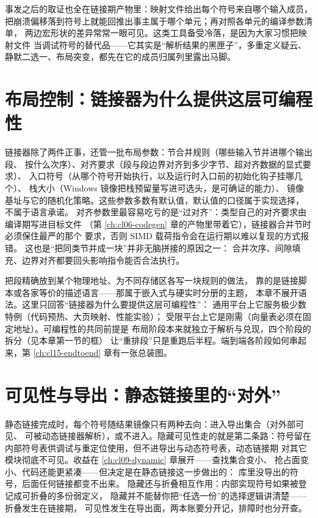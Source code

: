 \documentclass[12pt,a4paper,fontset=fandol]{ctexbook}
\newcommand{\Win}{\textsf{Windows}}
\begin{document}
事发之后的取证也全在链接期产物里：映射文件给出每个符号来自哪个输入成员，
把崩溃偏移落到符号上就能回推出事主属于哪个单元；再对照各单元的编译参数清单，
两边宏形状的差异常常一眼可见。这类工具备受冷落，是因为大家习惯把映射文件
当调试符号的替代品——它其实是“解析结果的黑匣子”，多重定义疑云、
静默二选一、布局突变，都先在它的成员归属列里露出马脚。

\section{布局控制：链接器为什么提供这层可编程性}\label{sec:cl08-layout}

链接器除了两件正事，还管一批布局参数：节合并规则（哪些输入节并进哪个输出段、
按什么次序）、对齐要求（段与段边界对齐到多少字节、超对齐数据的显式要求）、
入口符号（从哪个符号开始执行，以及运行时入口前的初始化钩子挂哪几个）、
栈大小（\Win{} 镜像把栈预留量写进可选头，是可确证的能力）、
镜像基址与它的随机化策略。这些参数多数有默认值，默认值的口径属于实现选择，
不属于语言承诺。
对齐参数里最容易吃亏的是“过对齐”：类型自己的对齐要求由编译期写进目标文件
（第 \ref{ch:cl06-codegen} 章的产物里带着它），链接器合并节时必须保住最严的那个
要求，否则 SIMD 载荷指令会在运行期以难以复现的方式报错。
这也是“把同类节并成一块”并非无脑拼接的原因之一：
合并次序、间隙填充、边界对齐都要回头影响指令能否合法执行。

把段精确放到某个物理地址、为不同存储区各写一块规则的做法，
靠的是链接脚本或各家等价的描述语言——那属于嵌入式与硬实时分册的主题，
本章不展开语法。这里只回答“链接器为什么要提供这层可编程性”：
通用平台上它服务极少数特例（代码预热、大页映射、性能实验）；
受限平台上它是刚需（向量表必须在固定地址）。可编程性的共同前提是
布局阶段本来就独立于解析与兑现，四个阶段的拆分（见本章第一节的框）
让“重排段”只是重跑后半程。端到端各阶段如何串起来，第
\ref{ch:cl15-endtoend} 章有一张总装图。

\section{可见性与导出：静态链接里的“对外”}\label{sec:cl08-visibility}

静态链接完成时，每个符号随结果镜像只有两种去向：进入导出集合（对外部可见、
可被动态链接器解析），或不进入。隐藏可见性走的就是第二条路：符号留在
内部符号表供调试与重定位使用，但不进导出与动态符号表，动态链接期
对其它模块彻底不可见。收益在 \ref{ch:cl09-dynamic} 章展开——查找集合变小、
抢占面变小、代码还能更紧凑——但决定是在静态链接这一步做出的：
库里没导出的符号，后面任何链接都变不出来。
隐藏还与折叠相互作用：内部实现符号如果被登记成可折叠的多份弱定义，
隐藏并不能替你把“任选一份”的选择逻辑讲清楚——折叠发生在链接期，
可见性发生在导出面，两本账要分开记，排障时也分开查。
\end{document}
